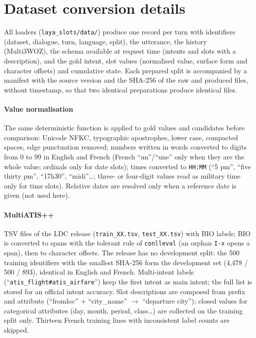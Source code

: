 \section{Dataset conversion details}
\label{app:conversion}

All loaders (\texttt{laya\_slots/data/}) produce one record per turn with identifiers (dataset, dialogue, turn, language, split), the utterance, the history (Multi3WOZ), the schema available at request time (intents and slots with a description), and the gold intent, slot values (normalised value, surface form and character offsets) and cumulative state. Each prepared split is accompanied by a manifest with the source version and the SHA-256 of the raw and produced files, without timestamp, so that two identical preparations produce identical files.

\paragraph{Value normalisation} The same deterministic function is applied to gold values and candidates before comparison: Unicode NFKC, typographic apostrophes, lower case, compacted spaces, edge punctuation removed; numbers written in words converted to digits from 0 to 99 in English and French (French ``un''/``une'' only when they are the whole value; ordinals only for date slots); times converted to \texttt{HH:MM} (``5 pm'', ``five thirty pm'', ``17h30'', ``midi''\ldots; three- or four-digit values read as military time only for time slots). Relative dates are resolved only when a reference date is given (not used here).

\paragraph{MultiATIS++} TSV files of the LDC release (\texttt{train\_XX.tsv}, \texttt{test\_XX.tsv}) with BIO labels; BIO is converted to spans with the tolerant rule of \texttt{conlleval} (an orphan \texttt{I-x} opens a span), then to character offsets. The release has no development split: the 500 training identifiers with the smallest SHA-256 form the development set (4,478 / 500 / 893), identical in English and French. Multi-intent labels (``\texttt{atis\_flight\#atis\_airfare}'') keep the first intent as main intent; the full list is stored for an official intent accuracy. Slot descriptions are composed from prefix and attribute (``fromloc'' + ``city\_name'' $\rightarrow$ ``departure city''); closed values for categorical attributes (day, month, period, class\ldots) are collected on the training split only. Thirteen French training lines with inconsistent label counts are skipped.

